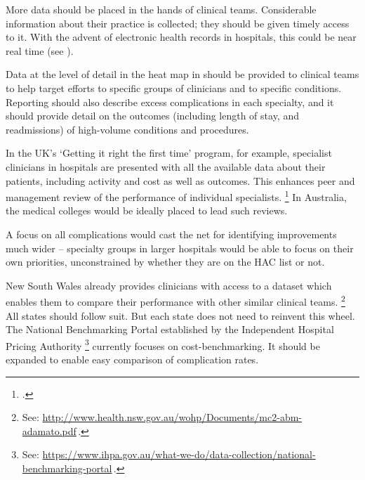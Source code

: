 \documentclass[FrontPage]{grattan}
\begin{document}
More data should be placed in the hands of clinical teams.
Considerable information about their practice is collected; they should be given timely access to it. With the advent of electronic health records in hospitals, this could be near real time (see ).

Data at the level of detail in the heat map in  should be provided to clinical teams to help target efforts to specific groups of clinicians and to specific conditions.
Reporting should also describe excess complications in each specialty, and it should provide detail on the outcomes (including length of stay, and readmissions) of high-volume conditions and procedures.

In the UK's `Getting it right the first time' program, for example, specialist clinicians in hospitals are presented with all the available data about their patients, including activity and cost as well as outcomes.
This enhances peer and management review of the performance of individual specialists.%
	\footcite{Timmins-2017-Tackling-variations-in-clinical-care}
In Australia, the medical colleges would be ideally placed to lead such reviews.

A focus on all complications would cast the net for identifying improvements much wider -- specialty groups in larger hospitals would be able to focus on their own priorities, unconstrained by whether they are on the HAC list or not.

New South Wales already provides clinicians with access to a dataset which enables them to compare their performance with other similar clinical teams.%
	\footnote{See: \textcolor{blue}{\url{http://www.health.nsw.gov.au/wohp/Documents/mc2-abm-adamato.pdf}}\,.}
All states should follow suit.
But each state does not need to reinvent this wheel.
	The National Benchmarking Portal established by the Independent Hospital Pricing Authority%
		\footnote{See: \textcolor{blue}{\url{https://www.ihpa.gov.au/what-we-do/data-collection/national-benchmarking-portal}}\,.}
currently focuses on cost-benchmarking.
It should be expanded to enable easy comparison of complication rates.
\end{document}
